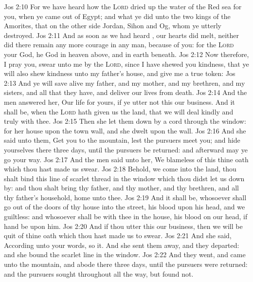 \vs Jos 2:10 For we have heard how the \textsc{Lord} dried up the water of the Red sea for you, when ye came out of Egypt; and what ye did unto the two kings of the Amorites, that  on the other side Jordan, Sihon and Og, whom ye utterly destroyed.
\vs Jos 2:11 And as soon as we had heard , our hearts did melt, neither did there remain any more courage in any man, because of you: for the \textsc{Lord} your God, he  God in heaven above, and in earth beneath.
\vs Jos 2:12 Now therefore, I pray you, swear unto me by the \textsc{Lord}, since I have shewed you kindness, that ye will also shew kindness unto my father's house, and give me a true token:
\vs Jos 2:13 And  ye will save alive my father, and my mother, and my brethren, and my sisters, and all that they have, and deliver our lives from death.
\vs Jos 2:14 And the men answered her, Our life for yours, if ye utter not this our business. And it shall be, when the \textsc{Lord} hath given us the land, that we will deal kindly and truly with thee.
\vs Jos 2:15 Then she let them down by a cord through the window: for her house  upon the town wall, and she dwelt upon the wall.
\vs Jos 2:16 And she said unto them, Get you to the mountain, lest the pursuers meet you; and hide yourselves there three days, until the pursuers be returned: and afterward may ye go your way.
\vs Jos 2:17 And the men said unto her, We  blameless of this thine oath which thou hast made us swear.
\vs Jos 2:18 Behold,  we come into the land, thou shalt bind this line of scarlet thread in the window which thou didst let us down by: and thou shalt bring thy father, and thy mother, and thy brethren, and all thy father's household, home unto thee.
\vs Jos 2:19 And it shall be,  whosoever shall go out of the doors of thy house into the street, his blood  upon his head, and we  guiltless: and whosoever shall be with thee in the house, his blood  on our head, if  hand be upon him.
\vs Jos 2:20 And if thou utter this our business, then we will be quit of thine oath which thou hast made us to swear.
\vs Jos 2:21 And she said, According unto your words, so  it. And she sent them away, and they departed: and she bound the scarlet line in the window.
\vs Jos 2:22 And they went, and came unto the mountain, and abode there three days, until the pursuers were returned: and the pursuers sought  throughout all the way, but found  not.
